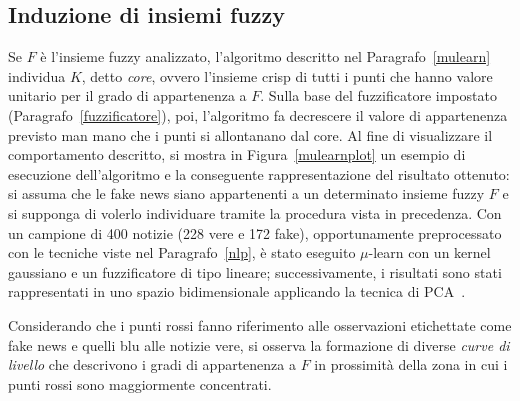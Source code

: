 \documentclass[12pt]{report}
\theoremstyle{definition}
\begin{document}
\subsection{Induzione di insiemi fuzzy}
Se $F$ è l'insieme fuzzy analizzato, l'algoritmo descritto nel Paragrafo~\ref{mulearn} individua $K$, detto \textit{core}, ovvero l'insieme crisp di tutti i punti che hanno valore unitario per il grado di appartenenza a $F$. Sulla base del fuzzificatore impostato (Paragrafo~\ref{fuzzificatore}), poi, l'algoritmo fa decrescere il valore di appartenenza previsto man mano che i punti si allontanano dal core. 
Al fine di visualizzare il comportamento descritto, si mostra in Figura~\ref{mulearnplot} un esempio di esecuzione dell'algoritmo e la conseguente rappresentazione del risultato ottenuto:
si assuma che le fake news siano appartenenti a un determinato insieme fuzzy $F$ e si supponga di volerlo individuare tramite la procedura vista in precedenza.
Con un campione di 400 notizie (228 vere e 172 fake), opportunamente preprocessato con le tecniche viste nel Paragrafo~\ref{nlp}, è stato eseguito $\mu$-learn con un kernel gaussiano e un fuzzificatore di tipo lineare; successivamente, i risultati sono stati rappresentati in uno spazio bidimensionale applicando la tecnica di PCA~\cite{30}.

Considerando che i punti rossi fanno riferimento alle osservazioni etichettate come fake news e quelli blu alle notizie vere, si osserva la formazione di diverse \textit{curve di livello} che descrivono i gradi di appartenenza a $F$ in prossimità della zona in cui i punti rossi sono maggiormente concentrati.
\end{document}
